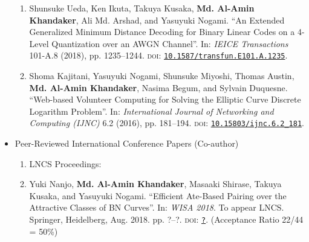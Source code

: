 \begin{itemize}
\begin{enumerate}
	\item Shunsuke Ueda, Ken Ikuta, Takuya Kusaka, \textbf{Md. Al-Amin Khandaker}, Ali Md. Arshad, and Yasuyuki Nogami. ``An Extended Generalized Minimum Distance Decoding for Binary Linear Codes on a 4-Level Quantization over an AWGN Channel”. In: \textit{IEICE Transactions} 101-A.8 (2018), pp. 1235–1244. \textsc{doi}: \href{https://doi.org/10.1587/transfun.E101.A.1235}{\texttt{10.1587/transfun.E101.A.1235}}.
	
	\item Shoma Kajitani, Yasuyuki Nogami, Shunsuke Miyoshi, Thomas Austin, \textbf{Md. Al-Amin Khandaker}, Nasima Begum, and Sylvain Duquesne. “Web-based Volunteer Computing for Solving the Elliptic Curve Discrete Logarithm Problem”. In: \textit{International Journal of Networking and Computing (IJNC) }6.2 (2016), pp. 181–194. \textsc{doi}: \href{https://doi.org/10.15803/ijnc.6.2_181}{\texttt{10.15803/ijnc.6.2\_181}}.
	
\end{enumerate}
\clearpage

\vspace{10mm}
	\Large
	\item Peer-Reviewed International Conference Papers  (Co-author)
\begin{enumerate}
	\item[ ] \Large LNCS Proceedings:
	\normalsize
	\item Yuki Nanjo, \textbf{Md. Al-Amin Khandaker}, Masaaki Shirase, Takuya Kusaka, and Yasuyuki Nogami. ``Efficient Ate-Based Pairing over the Attractive Classes of BN Curves''. In: \textit{WISA 2018}. To appear LNCS. Springer, Heidelberg,  Aug. 2018.  pp. ?–?. \textsc{doi}: \href{?}{\texttt{?}}. (Acceptance Ratio 22/44 = 50\%)
	

\end{enumerate}
\end{itemize}

